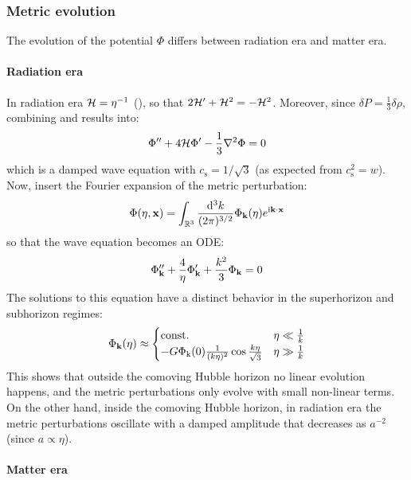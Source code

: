 \subsubsection{Metric evolution}

The evolution of the potential $ \Phi $ differs between radiation era and matter era.

\paragraph{Radiation era}

In radiation era $ \mathcal{H} = \eta^{-1} $ (), so that $ 2\mathcal{H}' + \mathcal{H}^2 = - \mathcal{H}^2 $. Moreover, since $ \delta P = \frac{1}{3} \delta \rho $, combining  and  results into:
\begin{equation}
  \Phi'' + 4\mathcal{H} \Phi' - \frac{1}{3} \nabla^2 \Phi = 0
\end{equation}
which is a damped wave equation with $ c_\text{s} = 1/\sqrt{3} $ (as expected from $ c_\text{s}^2 = w $). Now, insert the Fourier expansion of the metric perturbation:
\begin{equation}
  \Phi(\eta , \mathbf{x}) = \int_{\mathbb{R}^3} \frac{\mathrm{d}^3 k}{(2\pi)^{3/2}} \Phi_{\mathbf{k}}(\eta) e^{\mathrm{i} \mathbf{k} \cdot \mathbf{x}}
  \label{eq:f-fourier}
\end{equation}
so that the wave equation becomes an ODE:
\begin{equation*}
  \Phi_{\mathbf{k}}'' + \frac{4}{\eta} \Phi_{\mathbf{k}}' + \frac{k^2}{3} \Phi_{\mathbf{k}} = 0
\end{equation*}
The solutions to this equation have a distinct behavior in the superhorizon and subhorizon regimes:
\begin{equation}
  \Phi_{\mathbf{k}}(\eta) \approx
  \begin{cases}
    \text{const.} & \eta \ll \frac{1}{k} \\
    - G \Phi_\text{k}(0) \frac{1}{(k \eta)^2} \cos \frac{k \eta}{\sqrt{3}} & \eta \gg \frac{1}{k}
  \end{cases}
  \label{eq:metric-pert-rad}
\end{equation}
This shows that outside the comoving Hubble horizon no linear evolution happens, and the metric perturbations only evolve with small non-linear terms. On the other hand, inside the comoving Hubble horizon, in radiation era the metric perturbations oscillate with a damped amplitude that decreases as $ a^{-2} $ (since $ a \propto \eta $).

\paragraph{Matter era}

